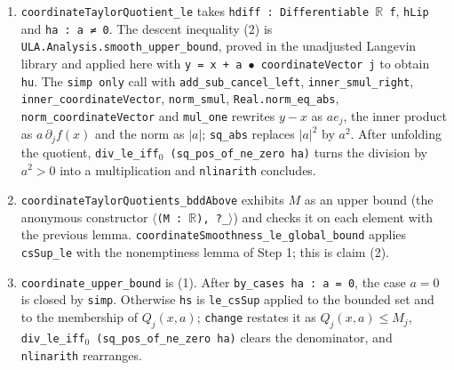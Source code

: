 \documentclass[11pt,a4paper]{article}
\begin{document}
\begin{leanbox}
\begin{enumerate}
\item \texttt{coordinate\allowbreak{}Taylor\allowbreak{}Quotient\_\allowbreak{}le} takes \texttt{hdiff : Differentiable \ensuremath{\mathbb R} f}, \texttt{h\allowbreak{}Lip} and \texttt{ha : a ≠ 0}. The descent inequality (2) is \texttt{ULA.\allowbreak{}Analysis.\allowbreak{}smooth\_\allowbreak{}upper\_\allowbreak{}bound}, proved in the unadjusted Langevin library and applied here with \texttt{y = x + a \ensuremath{\bullet} coordinate\allowbreak{}Vector j} to obtain \texttt{hu}. The \texttt{simp only} call with \texttt{add\_\allowbreak{}sub\_\allowbreak{}cancel\_\allowbreak{}left}, \texttt{inner\_\allowbreak{}smul\_\allowbreak{}right}, \texttt{inner\_\allowbreak{}coordinate\allowbreak{}Vector}, \texttt{norm\_\allowbreak{}smul}, \texttt{Real.\allowbreak{}norm\_\allowbreak{}eq\_\allowbreak{}abs}, \texttt{norm\_\allowbreak{}coordinate\allowbreak{}Vector} and \texttt{mul\_\allowbreak{}one} rewrites \(y-x\) as \(ae_j\), the inner product as \(a\,\partial_jf(x)\) and the norm as \(|a|\); \texttt{sq\_\allowbreak{}abs} replaces \(|a|^2\) by \(a^2\). After unfolding the quotient, \texttt{div\_\allowbreak{}le\_\allowbreak{}iff\ensuremath{{}_{0}} (sq\_\allowbreak{}pos\_\allowbreak{}of\_\allowbreak{}ne\_\allowbreak{}zero ha)} turns the division by \(a^2>0\) into a multiplication and \texttt{nlinarith} concludes.

\item \texttt{coordinate\allowbreak{}Taylor\allowbreak{}Quotients\_\allowbreak{}bdd\allowbreak{}Above} exhibits \(M\) as an upper bound (the anonymous constructor \texttt{\ensuremath{\langle}(M : \ensuremath{\mathbb R}), ?\_\allowbreak{}\ensuremath{\rangle}}) and checks it on each element with the previous lemma. \texttt{coordinate\allowbreak{}Smoothness\_\allowbreak{}le\_\allowbreak{}global\_\allowbreak{}bound} applies \texttt{cs\allowbreak{}Sup\_\allowbreak{}le} with the nonemptiness lemma of Step 1; this is claim (2).

\item \texttt{coordinate\_\allowbreak{}upper\_\allowbreak{}bound} is (1). After \texttt{by\_\allowbreak{}cases ha : a = 0}, the case \(a=0\) is closed by \texttt{simp}. Otherwise \texttt{hs} is \texttt{le\_\allowbreak{}cs\allowbreak{}Sup} applied to the bounded set and to the membership of \(Q_j(x,a)\); \texttt{change} restates it as \(Q_j(x,a)\le M_j\), \texttt{div\_\allowbreak{}le\_\allowbreak{}iff\ensuremath{{}_{0}} (sq\_\allowbreak{}pos\_\allowbreak{}of\_\allowbreak{}ne\_\allowbreak{}zero ha)} clears the denominator, and \texttt{nlinarith} rearranges.

\end{enumerate}
\end{leanbox}
\end{document}
